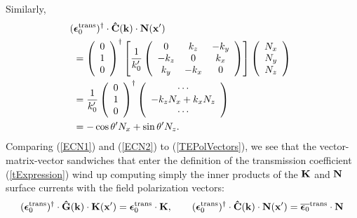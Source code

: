 \documentclass[letterpaper]{article}
\newcommand{\vbEps}{\boldsymbol{\epsilon}}
\begin{document}
Similarly, 
\begin{align}
&\hspace{-0.05in}
 (\vbEps_0\sups{trans})^\dagger \cdot
 \vbhat{C}(\vb k) \cdot \vb N(\vb x^\prime)
\nn
&=
 \left(\begin{array}{c}0 \\ 1 \\ 0\end{array}\right)^\dagger
 \left[ \frac{1}{k_0^{\prime}}
        \left(\begin{array}{ccc}
               0       & k_z     & -k_y    \\
               -k_z    & 0       & k_x     \\
               k_y     & -k_x    & 0
              \end{array}
        \right)
 \right]
 \left(\begin{array}{c}N_x \\ N_y \\ N_z\end{array}\right)
\nn
&=
 \frac{1}{k_0^\prime}
 \left(\begin{array}{c}0 \\ 1 \\ 0\end{array}\right)^\dagger
 \left(\begin{array}{c} \cdots \\ -k_z N_x + k_x N_z \\ \cdots
       \end{array}\right)
\nn
&=-\cos\theta^\prime N_x + \sin\theta^\prime N_z.
\label{ECN2}
\end{align}
Comparing (\ref{ECN1}) and (\ref{ECN2}) to (\ref{TEPolVectors}),
we see that the 
vector-matrix-vector sandwiches that enter the definition of 
the transmission coefficient (\ref{tExpression}) wind up 
computing simply the inner products of the $\mathbf{K}$ and $\mathbf{N}$
surface currents with the field polarization vectors: 
$$ (\vbEps_0\sups{trans})^\dagger
    \cdot
    \vbhat{G}(\vb k)
    \cdot
    \vb K(\vb x^\prime)
   = \vbEps_0\sups{trans} \cdot \vb K, 
   \qquad
   (\vbEps_0\sups{trans})^\dagger
    \cdot
    \vbhat{C}(\vb k)
    \cdot
    \vb N(\vb x^\prime)
   = \overline{\vbEps_0}\sups{trans} \cdot \vb N
$$
\end{document}
